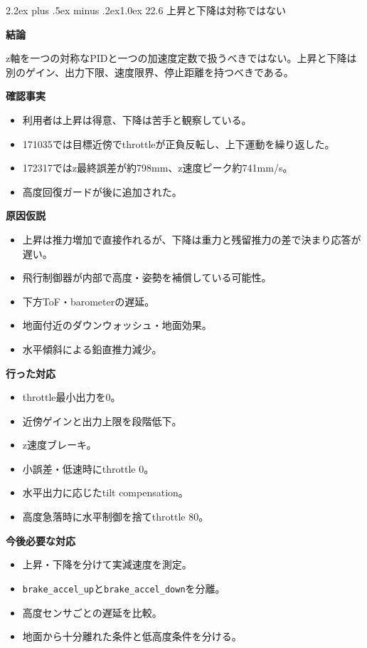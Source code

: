 \documentclass[10pt,a4paper,openany]{ltjsbook}
\makeatletter
\renewcommand\section{\@startsection{section}{1}{0pt}%
  {2.2ex plus .5ex minus .2ex}{1.0ex}%
  {\sffamily\Large\bfseries\color{ReportNavy}}}
\newcommand{\reportlabel}[1]{%
  \par\vspace{0.55em}%
  \noindent\colorbox{ReportTeal}{%
    \parbox{\dimexpr\linewidth-2\fboxsep\relax}{%
      \sffamily\bfseries\color{white}#1%
    }%
  }\par\vspace{0.20em}%
}
\makeatother
\begin{document}
\section{22.6 上昇と下降は対称ではない}
\reportlabel{結論}
z軸を一つの対称なPIDと一つの加速度定数で扱うべきではない。上昇と下降は別のゲイン、出力下限、速度限界、停止距離を持つべきである。\par
\reportlabel{確認事実}
\begin{itemize}
\item 利用者は上昇は得意、下降は苦手と観察している。
\item 171035では目標近傍でthrottleが正負反転し、上下運動を繰り返した。
\item 172317ではz最終誤差が約798mm、z速度ピーク約741mm/s。
\item 高度回復ガードが後に追加された。
\end{itemize}
\reportlabel{原因仮説}
\begin{itemize}
\item 上昇は推力増加で直接作れるが、下降は重力と残留推力の差で決まり応答が遅い。
\item 飛行制御器が内部で高度・姿勢を補償している可能性。
\item 下方ToF・barometerの遅延。
\item 地面付近のダウンウォッシュ・地面効果。
\item 水平傾斜による鉛直推力減少。
\end{itemize}
\reportlabel{行った対応}
\begin{itemize}
\item throttle最小出力を0。
\item 近傍ゲインと出力上限を段階低下。
\item z速度ブレーキ。
\item 小誤差・低速時にthrottle 0。
\item 水平出力に応じたtilt compensation。
\item 高度急落時に水平制御を捨てthrottle 80。
\end{itemize}
\reportlabel{今後必要な対応}
\begin{itemize}
\item 上昇・下降を分けて実減速度を測定。
\item \texttt{brake\_accel\_up}と\texttt{brake\_accel\_down}を分離。
\item 高度センサごとの遅延を比較。
\item 地面から十分離れた条件と低高度条件を分ける。
\end{itemize}
\vspace{0.3em}{\noindent\color{ReportLight}\rule{\linewidth}{0.8pt}}\vspace{0.3em}
\end{document}
